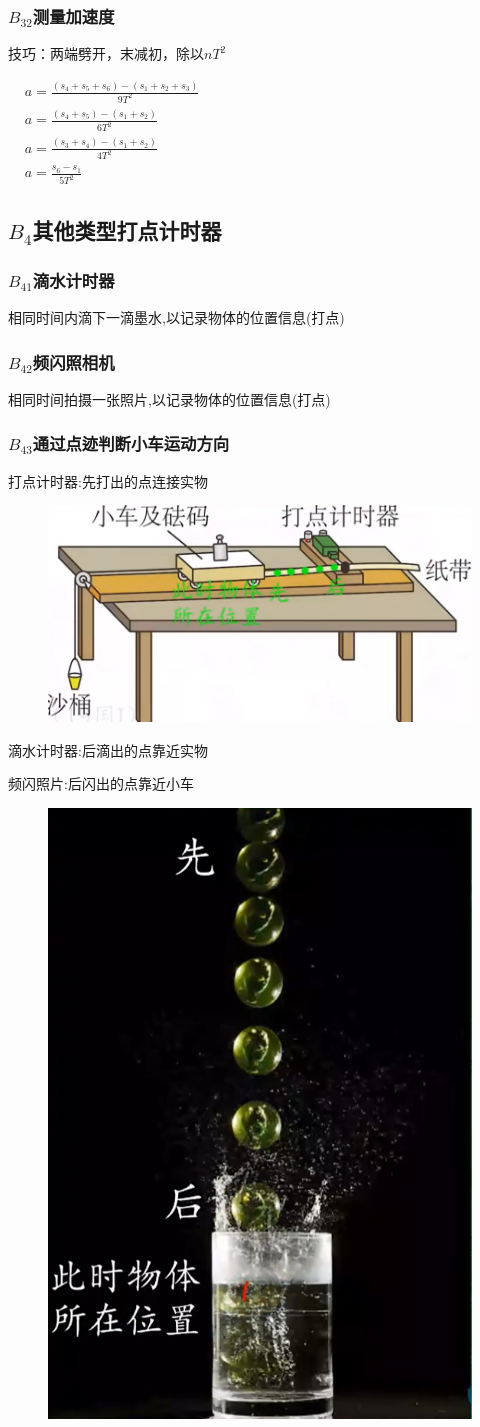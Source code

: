 \documentclass[lang=cn,10pt]{elegantbook}
\begin{document}
	\subsubsection{$B_{32}$测量加速度}
	技巧：两端劈开，末减初，除以$nT^{2}$
	
	$\begin{aligned}&a=\frac{(s_{4}+s_{5}+s_{6})-(s_{1}+s_{2}+s_{3})}{9T^{2}}\\&a=\frac{(s_{4}+s_{5})-(s_{1}+s_{2})}{6T^{2}}\\&a=\frac{(s_{3}+s_{4})-(s_{1}+s_{2})}{4T^{2}}\\&a=\frac{s_{6}-s_{1}}{5T^{2}}
	\end{aligned}$
	\subsection{$B_4$其他类型打点计时器}
	\subsubsection{$B_{41}$滴水计时器}
	相同时间内滴下一滴墨水,以记录物体的位置信息(打点)
	\subsubsection{$B_{42}$频闪照相机}
	相同时间拍摄一张照片,以记录物体的位置信息(打点)
	\subsubsection{$B_{43}$通过点迹判断小车运动方向}
	打点计时器:先打出的点连接实物
\begin{figure}[H]
	\centering
	\includegraphics[width=0.5\linewidth]{image/4}
\end{figure}
	滴水计时器:后滴出的点靠近实物
	
	频闪照片:后闪出的点靠近小车
	\begin{figure}[H]
		\centering
		\includegraphics[width=0.2\linewidth]{image/5}
	\end{figure}
\end{document}
